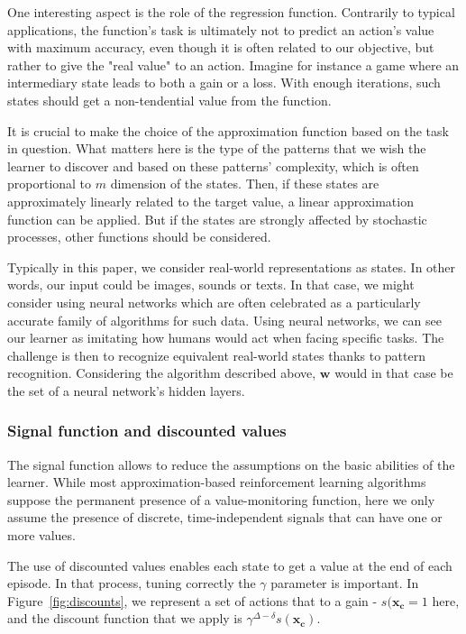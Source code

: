 \documentclass[scrartcl, 10.5 pt, conference]{ieeeconf}
\newcommand{\B}[1]{\mathbf{#1}}
\begin{document}
One interesting aspect is the role of the regression function. Contrarily to typical applications, the function's task is ultimately not to predict an action's value with maximum accuracy, even though it is often related to our objective, but rather to give the "real value" to an action. Imagine for instance a game where an intermediary state leads to both a gain or a loss. With enough iterations, such states should get a non-tendential value from the function.

It is crucial to make the choice of the approximation function based on the task in question. What matters here is the type of the patterns that we wish the learner to discover and based on these patterns' complexity, which is often proportional to $m$ dimension of the states. Then, if these states are approximately linearly related to the target value, a linear approximation function can be applied. But if the states are strongly affected by stochastic processes, other functions should be considered. 

Typically in this paper, we consider real-world representations as states. In other words, our input could be images, sounds or texts. In that case, we might consider using neural networks which are often celebrated as a particularly accurate family of algorithms for such data. Using neural networks, we can see our learner as imitating how humans would act when facing specific tasks. The challenge is then to recognize equivalent real-world states thanks to pattern recognition. Considering the algorithm described above, $\B{w}$ would in that case be the set of a neural network's hidden layers. 

\subsubsection{Signal function and discounted values}

The signal function allows to reduce the assumptions on the basic abilities of the learner. While most approximation-based reinforcement learning algorithms suppose the permanent presence of a value-monitoring function, here we only assume the presence of discrete, time-independent signals that can have one or more values.

The use of discounted values enables each state to get a value at the end of each episode. In that process, tuning correctly the $\gamma$ parameter is important. In Figure~\ref{fig:discounts}, we represent a set of actions that to a gain - $s(\B{x_c} = 1$ here, and the discount function that we apply is $\gamma^{\Delta-\delta}s(\B{x_c})$.
\end{document}
